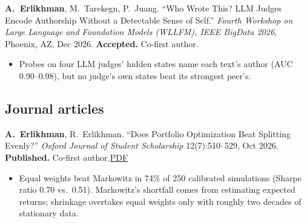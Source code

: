 \documentclass[letterpaper,11pt]{article}
\newcommand{\lnk}[2]{\href{#1}{\underline{#2}}}
\newcommand{\me}{\textbf{A.~Erlikhman}}
\begin{document}
\begin{pubs}
\begin{itemize}
  \end{itemize}
  \item \me, M.~Tarekegn, P.~Juang. ``Who Wrote This? LLM Judges Encode Authorship Without a Detectable Sense of Self.'' \textit{Fourth Workshop on Large Language and Foundation Models (WLLFM), IEEE BigData 2026}, Phoenix, AZ, Dec 2026. \textbf{Accepted.} Co-first author.
  \begin{itemize}
    \item Probes on four LLM judges' hidden states name each text's author (AUC 0.90--0.98), but no judge's own states beat its strongest peer's.
  \end{itemize}
\end{pubs}

\subsection{Journal articles}
\begin{pubs}[resume]
  \item \me, R.~Erlikhman. ``Does Portfolio Optimization Beat Splitting Evenly?'' \textit{Oxford Journal of Student Scholarship} 12(7):510--529, Oct 2026. \textbf{Published.} Co-first author.\enspace\lnk{https://adrianerlikhman.is-a.dev/papers/portfolio-optimization-vs-equal-weight.pdf}{PDF}
  \begin{itemize}
    \item Equal weights beat Markowitz in 74\% of 250 calibrated simulations (Sharpe ratio 0.70 vs.\ 0.51). Markowitz's shortfall comes from estimating expected returns; shrinkage overtakes equal weights only with roughly two decades of stationary data.
  \end{itemize}
\end{pubs}
\end{document}
